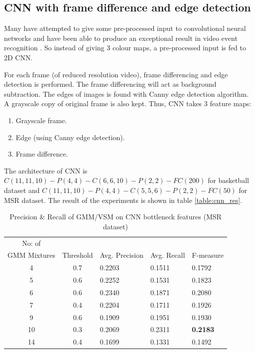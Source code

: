 \subsection{CNN with frame difference and edge detection}

Many have attempted to give some pre-processed input to convolutional neural networks and have been able to produce an exceptional result in video event recognition \citep{ji20133d}. So instead of giving 3 colour maps, a pre-processed input is fed to 2D CNN.

For each frame (of reduced resolution video), frame differencing and edge detection is performed. The frame differencing will act as background subtraction. The edges of images is found with Canny edge detection algorithm. A grayscale copy of original frame is also kept. Thus, CNN takes 3 feature maps:
\begin{enumerate}
\item Grayscale frame.
\item Edge (using Canny edge detection).
\item Frame difference.
\end{enumerate}

The architecture of CNN is $C(11, 11, 10)-P(4, 4)-C(6, 6, 10)-P(2, 2)-FC(200)$ for basketball dataset and $C(11, 11, 10)-P(4,4)-C(5, 5, 6)-P(2,2)-FC(50)$ for MSR dataset. The result of the experiments is shown in table \ref{table:cnn_res}.

\begin{table}[h]
\caption[Event spotting using GMM/VSM on CNN(Gray,Frame diff,Edge) bottleneck features (MSR Action Dataset) ]{ Precision \& Recall  of GMM/VSM on CNN bottleneck features (MSR dataset)}
\label{table:cnn_gmm_res_msr}
\centering
\begin{tabular}{|c|c|l|l|l|}
\hline
No: of &&&&\\
GMM Mixtures & Threshold & Avg. Precision & Avg. Recall & F-measure\\
\hline
\hline
 4 	&0.7 	&0.2203 	& 0.1511	&0.1792\\
 5 	&0.6 	&0.2252 	& 0.1531	&0.1823\\
 6 	&0.6 	&0.2340 	& 0.1871	&0.2080\\
 7 	&0.4 	&0.2204 	& 0.1711	&0.1926\\
 9 	&0.6 	&0.1909 	& 0.1951	&0.1930\\
10 	&0.3 	&0.2069 	& 0.2311	&\textbf{0.2183}\\
14 	&0.4 	&0.1699 	& 0.1331	&0.1492\\
\hline  
\end{tabular}
\end{table} 

